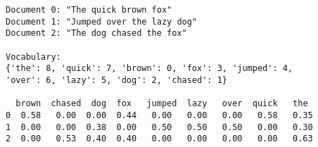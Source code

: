 \begin{verbatim}
Document 0: "The quick brown fox"
Document 1: "Jumped over the lazy dog"
Document 2: "The dog chased the fox"

Vocabulary: 
{'the': 8, 'quick': 7, 'brown': 0, 'fox': 3, 'jumped': 4,
'over': 6, 'lazy': 5, 'dog': 2, 'chased': 1}

  brown  chased  dog  fox   jumped  lazy   over  quick   the 
0  0.58   0.00  0.00  0.44   0.00   0.00   0.00   0.58   0.35  
1  0.00   0.00  0.38  0.00   0.50   0.50   0.50   0.00   0.30  
2  0.00   0.53  0.40  0.40   0.00   0.00   0.00   0.00   0.63   

\end{verbatim}